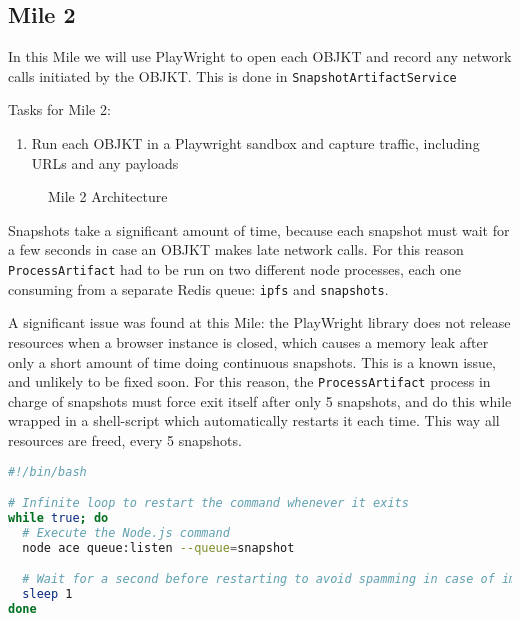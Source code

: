 \subsection {Mile 2}

In this Mile we will use PlayWright to open each OBJKT and record any network calls initiated by the OBJKT. This is done in \texttt{SnapshotArtifactService}

Tasks for Mile 2:
\begin{enumerate}
	\item Run each OBJKT in a Playwright sandbox and capture traffic, including URLs and any payloads
\end{enumerate}



\begin{figure}[h]
    \centering
    
    \caption[Mile 3 Architecture]{Mile 2 Architecture}
    \label{fig:mile2-arch}
\end{figure}


Snapshots take a significant amount of time, because each snapshot must wait for a few seconds in case an OBJKT makes late network calls. For this reason \texttt{ProcessArtifact} had to be run on two different node processes, each one consuming from a separate Redis queue: \texttt{ipfs} and \texttt{snapshots}.

A significant issue was found at this Mile: the PlayWright library does not release resources when a browser instance is closed, which causes a memory leak after only a short amount of time doing continuous snapshots. This is a known issue, and unlikely to be fixed soon. For this reason, the \texttt{ProcessArtifact} process in charge of snapshots must force exit itself after only 5 snapshots, and do this while wrapped in a shell-script which automatically restarts it each time. This way all resources are freed, every 5 snapshots.


\vspace{0.5cm}

\begin{lstlisting}[language=bash, caption={runSnapshotWorker.sh}] 
#!/bin/bash

# Infinite loop to restart the command whenever it exits
while true; do
  # Execute the Node.js command
  node ace queue:listen --queue=snapshot

  # Wait for a second before restarting to avoid spamming in case of immediate failure
  sleep 1
done
\end{lstlisting}


